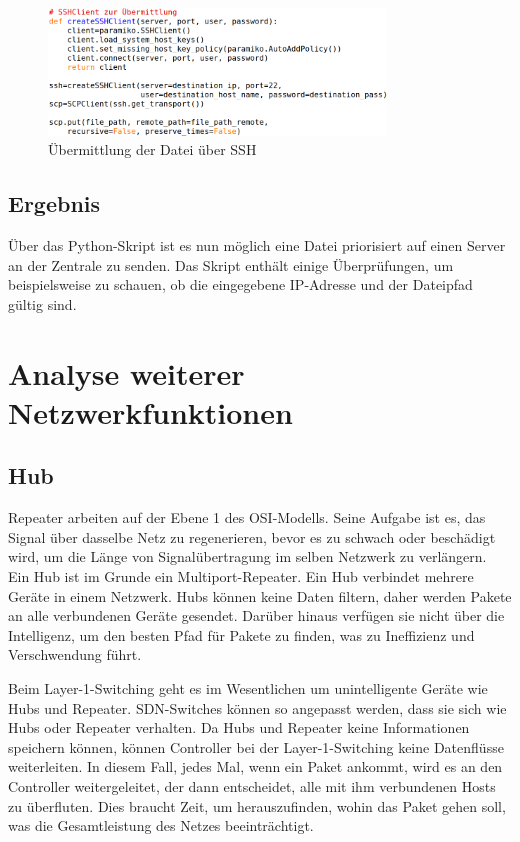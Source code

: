 \documentclass[fontsize=12pt,paper=a4,open=any,parskip=half,
  twoside=false,toc=listof,toc=bibliography,fleqn,leqno,
  captions=nooneline,captions=tableabove,british]{scrbook}
\begin{document}
\begin{figure}[H]
 \centering
 \includegraphics[width=0.8\textwidth]{Bilder/ssh}
 \captionsetup{justification=centering}
 \caption{Übermittlung der Datei über SSH}
 \label{ssh}
\end{figure}

\subsection{Ergebnis}
Über das Python-Skript ist es nun möglich eine Datei priorisiert auf einen Server an der Zentrale zu senden. Das Skript enthält einige Überprüfungen, um beispielsweise zu schauen, ob die eingegebene IP-Adresse und der Dateipfad gültig sind.


\section{Analyse weiterer Netzwerkfunktionen}

\subsection{Hub}
Repeater arbeiten auf der Ebene 1 des OSI-Modells. Seine Aufgabe ist es, das Signal über dasselbe Netz zu regenerieren, bevor es zu schwach oder beschädigt wird, um die Länge von Signalübertragung im selben Netzwerk zu verlängern. Ein Hub ist im Grunde ein Multiport-Repeater. Ein Hub verbindet mehrere Geräte in einem Netzwerk. Hubs können keine Daten filtern, daher werden Pakete an alle verbundenen Geräte gesendet. Darüber hinaus verfügen sie nicht über die Intelligenz, um den besten Pfad für Pakete zu finden, was zu Ineffizienz und Verschwendung führt.\par
Beim Layer-1-Switching geht es im Wesentlichen um unintelligente Geräte wie Hubs und Repeater. SDN-Switches können so angepasst werden, dass sie sich wie Hubs oder Repeater verhalten. Da Hubs und Repeater keine Informationen speichern können, können Controller bei der Layer-1-Switching keine Datenflüsse weiterleiten. In diesem Fall, jedes Mal, wenn ein Paket ankommt, wird es an den Controller weitergeleitet, der dann entscheidet, alle mit ihm verbundenen Hosts zu überfluten. Dies braucht Zeit, um herauszufinden, wohin das Paket gehen soll, was die Gesamtleistung des Netzes beeinträchtigt.
\end{document}
